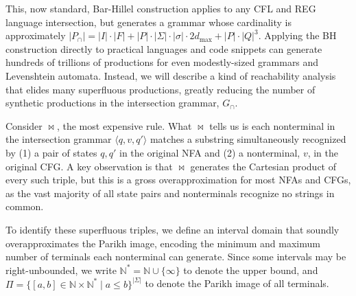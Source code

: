 \documentclass[sigplan,acmsmall,nonacm,screen]{acmart}\settopmatter{printfolios=false,printccs=false,printacmref=false}
\begin{document}
  \vspace{2pt}

  This, now standard, Bar-Hillel construction applies to any CFL and REG language intersection, but generates a grammar whose cardinality is approximately $|P_\cap|=|I|\cdot|F| + |P|\cdot|\Sigma|\cdot|\sigma|\cdot2d_{\max} + |P|\cdot|Q|^3$. Applying the BH construction directly to practical languages and code snippets can generate hundreds of trillions of productions for even modestly-sized grammars and Levenshtein automata. Instead, we will describe a kind of reachability analysis that elides many superfluous productions, greatly reducing the number of synthetic productions in the intersection grammar, $G_\cap$.

  Consider $\Join$, the most expensive rule. What $\Join$ tells us is each nonterminal in the intersection grammar $\langle q, v, q'\rangle$ matches a substring simultaneously recognized by (1) a pair of states $q, q'$ in the original NFA and (2) a nonterminal, $v$, in the original CFG. A key observation is that $\Join$ generates the Cartesian product of every such triple, but this is a gross overapproximation for most NFAs and CFGs, as the vast majority of all state pairs and nonterminals recognize no strings in common.

  To identify these superfluous triples, we define an interval domain that soundly overapproximates the Parikh image, encoding the minimum and maximum number of terminals each nonterminal can generate. Since some intervals may be right-unbounded, we write $\mathbb{N}^*=\mathbb{N} \cup \{\infty\}$ to denote the upper bound, and $\Pi = \{[a, b] \in \mathbb{N} \times \mathbb{N}^* \mid a \leq b\}^{|\Sigma|}$ to denote the Parikh image of all terminals.
\end{document}
